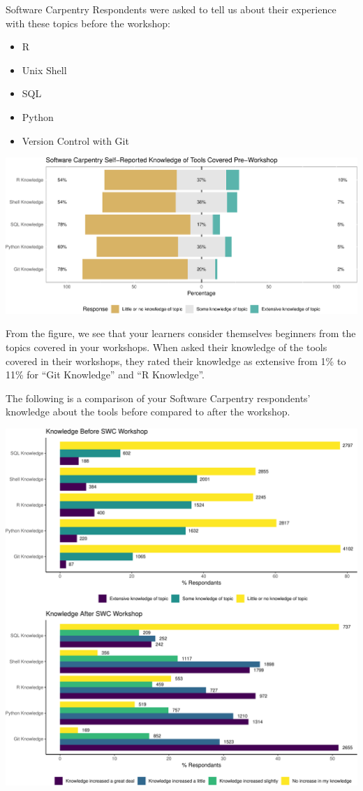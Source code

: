 \documentclass[]{article}
\makeatletter
\def\maxwidth{\ifdim\Gin@nat@width>\linewidth\linewidth\else\Gin@nat@width\fi}
\providecommand{\tightlist}{%
  \setlength{\itemsep}{0pt}\setlength{\parskip}{0pt}}
\makeatother
\begin{document}
Software Carpentry Respondents were asked to tell us about their
experience with these topics before the workshop:

\begin{itemize}
\tightlist
\item
  R
\item
  Unix Shell
\item
  SQL
\item
  Python
\item
  Version Control with Git
\end{itemize}

\includegraphics[width=\maxwidth]{../figures/swc-pre-tools-1}

From the figure, we see that your learners consider themselves beginners
from the topics covered in your workshops. When asked their knowledge of
the tools covered in their workshops, they rated their knowledge as
extensive from 1\% to 11\% for ``Git Knowledge'' and ``R Knowledge''.

The following is a comparison of your Software Carpentry respondents'
knowledge about the tools before compared to after the workshop.

\includegraphics[width=\maxwidth]{../figures/swc-knowledge-change-1}
\end{document}

